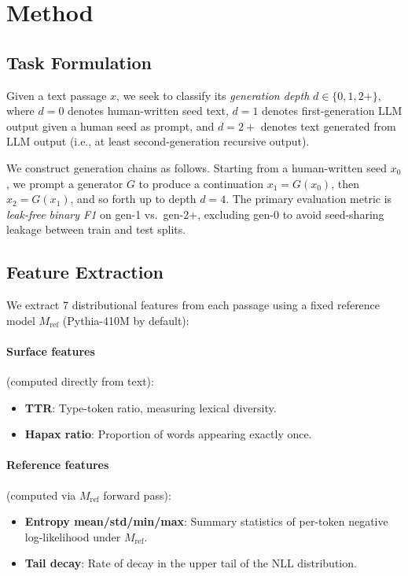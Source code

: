 \documentclass[11pt]{article}
\begin{document}
\section{Method}
\label{sec:method}

\subsection{Task Formulation}
\label{sec:task}

Given a text passage $x$, we seek to classify its \emph{generation depth} $d \in \{0, 1, 2+\}$, where $d=0$ denotes human-written seed text, $d=1$ denotes first-generation LLM output given a human seed as prompt, and $d=2+$ denotes text generated from LLM output (i.e., at least second-generation recursive output).

We construct generation chains as follows. Starting from a human-written seed $x_0$, we prompt a generator $G$ to produce a continuation $x_1 = G(x_0)$, then $x_2 = G(x_1)$, and so forth up to depth $d=4$. The primary evaluation metric is \emph{leak-free binary F1} on gen-1 vs.\ gen-2+, excluding gen-0 to avoid seed-sharing leakage between train and test splits.

\subsection{Feature Extraction}
\label{sec:features}

We extract 7 distributional features from each passage using a fixed reference model $M_{\mathrm{ref}}$ (Pythia-410M by default):

\paragraph{Surface features} (computed directly from text):
\begin{itemize}
\item \textbf{TTR}: Type-token ratio, measuring lexical diversity.
\item \textbf{Hapax ratio}: Proportion of words appearing exactly once.
\end{itemize}

\paragraph{Reference features} (computed via $M_{\mathrm{ref}}$ forward pass):
\begin{itemize}
\item \textbf{Entropy mean/std/min/max}: Summary statistics of per-token negative log-likelihood under $M_{\mathrm{ref}}$.
\item \textbf{Tail decay}: Rate of decay in the upper tail of the NLL distribution.
\end{itemize}
\end{document}
